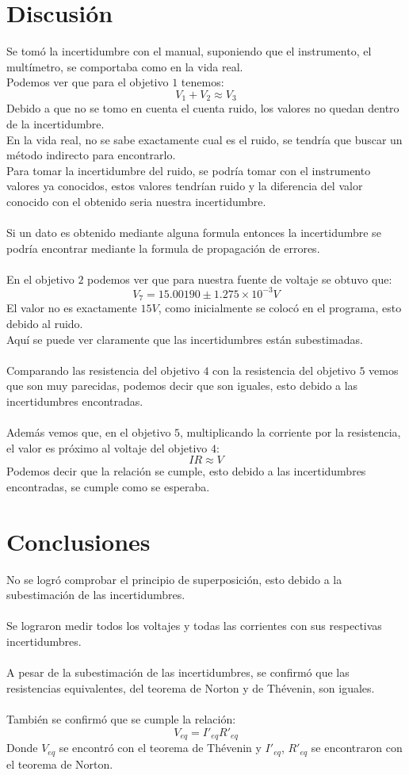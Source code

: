 \documentclass[DIV=calc, paper=a4, fontsize=11pt]{scrartcl}
\begin{document}
\begin{multicols}{2}
\section*{Discusión}
Se tomó la incertidumbre con el manual, suponiendo que el instrumento, el multímetro, se comportaba como en la vida real.
\\
Podemos ver que para el objetivo $1$ tenemos:
$$V_{1}+V_{2}\approx V_{3}$$
Debido a que no se tomo en cuenta el cuenta ruido, los valores no quedan dentro de la incertidumbre.
\\
En la vida real, no se sabe exactamente cual es el ruido, se tendría que buscar un método indirecto para encontrarlo.
\\
Para tomar la incertidumbre del ruido, se podría tomar con el instrumento valores ya conocidos, estos valores tendrían ruido y la diferencia del valor conocido con el obtenido seria nuestra incertidumbre.
\\
\\
Si un dato es obtenido mediante alguna formula entonces la incertidumbre se podría encontrar mediante la formula de propagación de errores.
\\\\
En el objetivo $2$ podemos ver que para nuestra fuente de voltaje se obtuvo que:
$$V_{7}=15.00190\pm1.275\times10^{-3}V$$
El valor no es exactamente $15V$, como inicialmente se colocó en el programa, esto debido al ruido.
\\
Aquí se puede ver claramente que las incertidumbres están subestimadas.
\\
\\
Comparando las resistencia del objetivo $4$ con la resistencia del objetivo $5$ vemos que son muy parecidas, podemos decir que son iguales, esto debido a las incertidumbres encontradas.
\\\\
Además vemos que, en el objetivo $5$, multiplicando la corriente por la resistencia, el valor es próximo al voltaje del objetivo $4$:
$$IR\approx V$$
Podemos decir que la relación se cumple, esto debido a las incertidumbres encontradas, se cumple como se esperaba.
\section*{Conclusiones}
No se logró comprobar el principio de superposición, esto debido a la subestimación de las incertidumbres.
\\\\
Se lograron medir todos los voltajes y todas las corrientes con sus respectivas incertidumbres.
\\\\
A pesar de la subestimación de las incertidumbres, se confirmó que las resistencias equivalentes, del teorema de Norton y de Thévenin, son iguales.
\\\\
También se confirmó que se cumple la relación:
$$V_{eq}=I'_{eq}R'_{eq}$$
Donde $V_{eq}$ se encontró con el teorema de Thévenin y $I'_{eq}$, $R'_{eq}$ se encontraron con el teorema de Norton.
\begin{thebibliography}{99}


\end{thebibliography}
\end{multicols}
\end{document}
